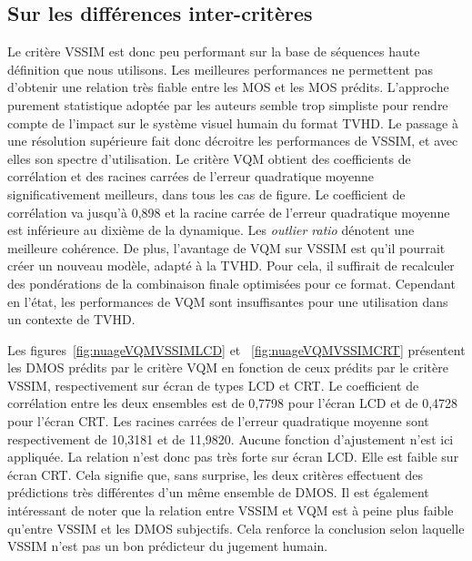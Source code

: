 \subsection{Sur les différences inter-critères}
Le critère VSSIM est donc peu performant sur la base de séquences haute définition que nous utilisons. Les meilleures performances ne permettent pas d'obtenir une relation très fiable entre les MOS et les MOS prédits. L'approche purement statistique adoptée par les auteurs semble trop simpliste pour rendre compte de l'impact sur le système visuel humain du format TVHD. Le passage à une résolution supérieure fait donc décroitre les performances de VSSIM, et avec elles son spectre d'utilisation. Le critère VQM obtient des coefficients de corrélation et des racines carrées de l'erreur quadratique moyenne significativement meilleurs, dans tous les cas de figure. Le coefficient de corrélation va jusqu'à 0,898 et la racine carrée de l'erreur quadratique moyenne est inférieure au dixième de la dynamique. Les \emph{outlier ratio} dénotent une meilleure cohérence. De plus, l'avantage de VQM sur VSSIM est qu'il pourrait créer un nouveau modèle, adapté à la TVHD. Pour cela, il suffirait de recalculer des pondérations de la combinaison finale optimisées pour ce format. Cependant en l'état, les performances de VQM sont insuffisantes pour une utilisation dans un contexte de TVHD. %

Les figures~\ref{fig:nuageVQMVSSIMLCD} et ~\ref{fig:nuageVQMVSSIMCRT} présentent les DMOS prédits par le critère VQM en fonction de ceux prédits par le critère VSSIM, respectivement sur écran de types LCD et CRT. Le coefficient de corrélation entre les deux ensembles est de 0,7798 pour l'écran LCD et de 0,4728 pour l'écran CRT. Les racines carrées de l'erreur quadratique moyenne sont respectivement de 10,3181 et de 11,9820. Aucune fonction d'ajustement n'est ici appliquée. La relation n'est donc pas très forte sur écran LCD. Elle est faible sur écran CRT. Cela signifie que, sans surprise, les deux critères effectuent des prédictions très différentes d'un même ensemble de DMOS. Il est également intéressant de noter que la relation entre VSSIM et VQM est à peine plus faible qu'entre VSSIM et les DMOS subjectifs. Cela renforce la conclusion selon laquelle VSSIM n'est pas un bon prédicteur du jugement humain.

